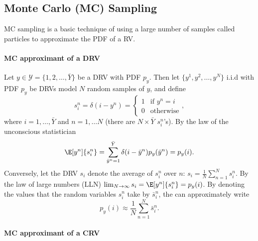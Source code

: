 \documentclass[]{hsrzf}
\theoremstyle{plain}
\theoremstyle{definition}
\theoremstyle{remark}
\begin{document}
\subsection{Monte Carlo (MC) Sampling}

MC sampling is a basic technique of using a large number of samples called
particles to approximate the PDF of a RV.

\paragraph{MC approximant of a DRV}

Let $y \in \mathcal{Y} = \{1,2,\ldots,\bar{Y}\}$ be a DRV with PDF $p_y$.
Then let $\{y^1, y^2, \ldots, y^N\}$ i.i.d with PDF $p_y$ be DRVs model
$N$ random samples of $y$, and define
\[
  s_i^n = \delta(i - y^n) = \begin{cases} 1 & \text{if } y^n = i \\
    0 & \text{otherwise} \end{cases},
\]
where $i = 1,\ldots,\bar{Y}$ and $n = 1, \ldots N$ (there are $N\times
\bar{Y}$ $s_i^n$'s). By the law of the unconscious statistician
\[
  \E[y^n]{s^n_i} =
    \sum_{\bar{y}^n = 1}^{\bar{Y}} \delta(i - \bar{y}^n) p_y(\bar{y}^n)
    = p_y(i).
\]
Conversely, let the DRV $s_i$ denote the average of $s_i^n$ over $n$: $s_i =
\frac{1}{N} \sum_{n=1}^N s_i^n$. By the law of large numbers
(LLN) $\lim_{N\to\infty} s_i = \E[y^n]{s_i^n} = p_y(i)$. By denoting the values that
the random variables $s_i^n$ take by $\bar{s}_i^n$, the can approximately
write
\[
  p_y(i) \approx \frac{1}{N} \sum_{n=1}^N \bar{s}_i^n.
\]

\paragraph{MC approximant of a CRV}
\end{document}
